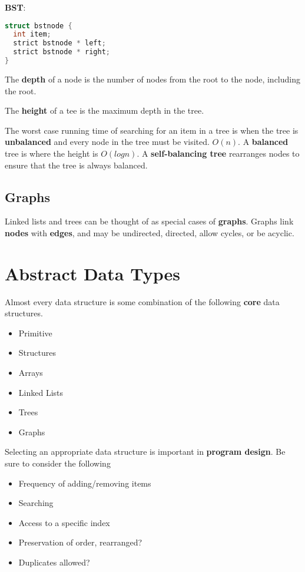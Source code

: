 \documentclass[english, 12pt]{article}
\begin{document}
\begin{defn}
\textbf{BST}:
\begin{lstlisting}[language=C]
struct bstnode {
  int item;
  strict bstnode * left;
  strict bstnode * right;
}
\end{lstlisting}
\end{defn}

\begin{defn}
The \textbf{depth} of a node is the number of nodes from the root to the node, including the root.
\end{defn}

\begin{defn}
The \textbf{height} of a tee is the maximum depth in the tree.
\end{defn}

\begin{note}
The worst case running time of searching for an item in a tree is when the tree is \textbf{unbalanced} and every node in the tree must be visited. $O(n)$. A \textbf{balanced} tree is where the height is $O(log n)$. A \textbf{self-balancing tree} rearranges nodes to ensure that the tree is always balanced.
\end{note}

\subsection{Graphs}
Linked lists and trees can be thought of as special cases of \textbf{graphs}. Graphs link \textbf{nodes} with \textbf{edges}, and may be undirected, directed, allow cycles, or be acyclic.

\section{Abstract Data Types}
Almost every data structure is some combination of the following \textbf{core} data structures.
\begin{itemize}
\item Primitive
\item Structures
\item Arrays
\item Linked Lists
\item Trees
\item Graphs
\end{itemize}
Selecting an appropriate data structure is important in \textbf{program design}. Be sure to consider the following
\begin{itemize}
\item Frequency of adding/removing items
\item Searching
\item Access to a specific index
\item Preservation of order, rearranged?
\item Duplicates allowed?
\end{itemize}
\end{document}
